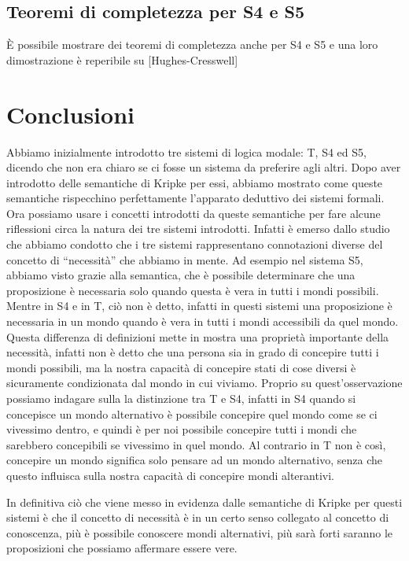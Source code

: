 \documentclass[a4paper, titlepage, 12pt]{report}
\begin{document}
\subsection{Teoremi di completezza per S4 e S5}
È possibile mostrare dei teoremi di completezza anche per S4 e S5 e una loro dimostrazione
è reperibile su [Hughes-Cresswell]

\section{Conclusioni}
Abbiamo inizialmente introdotto tre sistemi di logica modale: T, S4 ed S5,
dicendo che non era chiaro se ci fosse un sistema da preferire agli altri.
Dopo aver introdotto delle semantiche di Kripke per essi, abbiamo mostrato
come queste semantiche rispecchino perfettamente l'apparato deduttivo dei sistemi formali.
Ora possiamo usare i concetti introdotti da queste semantiche per fare alcune riflessioni
circa la natura dei tre sistemi introdotti. Infatti è emerso dallo studio che abbiamo condotto
che i tre sistemi rappresentano connotazioni diverse del concetto di ``necessità''
che abbiamo in mente.
Ad esempio nel sistema S5, abbiamo visto grazie alla semantica, che è possibile
determinare che una proposizione è necessaria solo quando questa è vera in tutti i mondi
possibili. Mentre in S4 e in T, ciò non è detto, infatti in questi sistemi una proposizione
è necessaria in un mondo quando è vera in tutti i mondi accessibili da quel mondo.
Questa differenza di definizioni mette in mostra una proprietà importante della necessità,
infatti non è detto che una persona sia in grado di concepire tutti i mondi possibili,
ma la nostra capacità di concepire stati di cose diversi è sicuramente condizionata dal mondo
in cui viviamo. Proprio su quest'osservazione possiamo indagare sulla la distinzione tra T e S4,
infatti in S4 quando si concepisce un mondo alternativo è possibile concepire quel mondo
come se ci vivessimo dentro, e quindi è per noi possibile concepire tutti i mondi che sarebbero
concepibili se vivessimo in quel mondo. Al contrario in T non è così, concepire un mondo
significa solo pensare ad un mondo alternativo, senza che questo influisca sulla nostra capacità
di concepire mondi alterantivi.

In definitiva ciò che viene messo in evidenza dalle semantiche di Kripke per questi sistemi è
che il concetto di necessità è in un certo senso collegato al concetto di conoscenza, più
è possibile conoscere mondi alternativi, più sarà forti saranno le proposizioni che possiamo
affermare essere vere.
\end{document}
